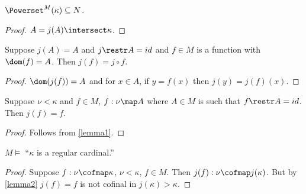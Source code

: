 \documentclass[oneside,12pt]{amsart}
\begin{document}
\begin{lemma}
\label{lemma0}
$\Powerset^{M}(\kappa) \subseteq N$.
\end{lemma}
\begin{proof}
$A=j(A)\intersect\kappa$.
\end{proof}

\begin{lemma}
\label{lemma1}
Suppose $j(A) = A$ and $j\restr A = id$ and $f\in M$ is a function with $\dom(f) = A$. Then $j(f) = j \circ f$.
\end{lemma}
\begin{proof}
$\dom(j(f)) = A$ and for  $x \in A$, if $y = f(x)$ then $j(y) = j(f)(x)$.
\end{proof}

\begin{lemma}
\label{lemma2}
Suppose $\nu<\kappa$ and $f\in M$, $f:\nu \map A$ where $A\in M$ is such that $f\restr A = id$.
Then $j(f) = f$.
\end{lemma}
\begin{proof}
Follows from \ref{lemma1}.
\end{proof}

\begin{lemma}
$M\models$ ``$\kappa$ is a regular cardinal.''
\end{lemma}
\begin{proof}
Suppose $f:\nu\cofmap\kappa$, $\nu < \kappa$, $f\in M$. Then $j(f) : \nu \cofmap j(\kappa)$.
But by \ref{lemma2} $j(f) = f$ is not cofinal in $j(\kappa) > \kappa$.
\end{proof}
\end{document}
